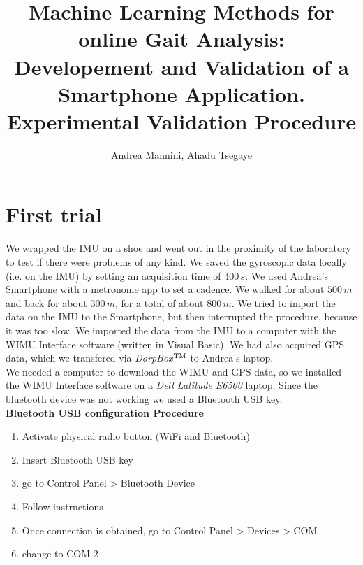 \documentclass[a4paper,twoside,10pt]{report}
\def\tm{\leavevmode\hbox{$\rm {}^{TM}$}}
\begin{document}
\pagestyle{empty} %




\title{Machine Learning Methods for online Gait Analysis:\\
Developement and Validation of a Smartphone Application.\\ 
Experimental Validation Procedure}

\author{Andrea Mannini, Ahadu Tsegaye}

\maketitle


\pagestyle{plain}



\section{First trial}
We wrapped the IMU on a shoe and went out in the proximity of the laboratory to test if there were problems of any kind. 
We saved the gyroscopic data locally (i.e. on the IMU) by setting an acquisition time of $400\,s$. We used Andrea's Smartphone with a metronome app to set a cadence. We walked for about $500\,m$ and back for about $300\,m$, for a total of about $800\,m$.  We tried to import the data on the IMU to the Smartphone, but then interrupted the procedure, because it was too slow. We imported the data from the IMU to a computer with the WIMU Interface software (written in Visual Basic). We had also acquired GPS data, which we transfered via \textit{DorpBox\tm} to Andrea's laptop.\\
We needed a computer to download the WIMU and GPS data, so we installed the WIMU Interface software on a \textit{Dell Latitude E6500} laptop. Since the bluetooth device was not working we used a Bluetooth USB key. \\
\textbf{Bluetooth USB configuration Procedure}\\
\begin{enumerate}
  \item Activate physical radio button (WiFi and Bluetooth)
	\item Insert Bluetooth USB key
	\item go to Control Panel > Bluetooth Device
	\item Follow instructions
	\item Once connection is obtained, go to Control Panel > Devices > COM 
	\item change to COM 2
\end{enumerate}
\end{document}
